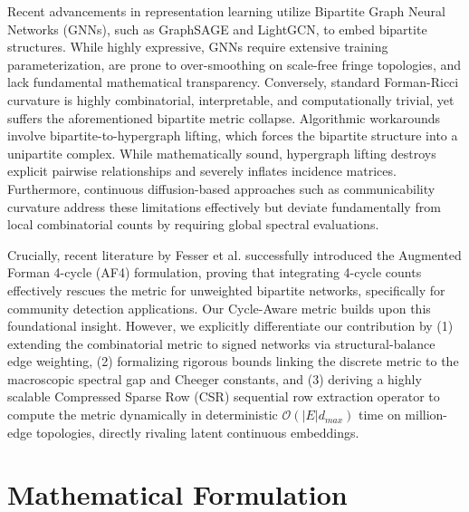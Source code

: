 \documentclass{siuro250211}
\begin{document}
Recent advancements in representation learning utilize Bipartite Graph Neural Networks (GNNs), such as GraphSAGE and LightGCN, to embed bipartite structures. While highly expressive, GNNs require extensive training parameterization, are prone to over-smoothing on scale-free fringe topologies, and lack fundamental mathematical transparency. Conversely, standard Forman-Ricci curvature is highly combinatorial, interpretable, and computationally trivial, yet suffers the aforementioned bipartite metric collapse. Algorithmic workarounds involve bipartite-to-hypergraph lifting, which forces the bipartite structure into a unipartite complex. While mathematically sound, hypergraph lifting destroys explicit pairwise relationships and severely inflates incidence matrices. Furthermore, continuous diffusion-based approaches such as communicability curvature \cite{estrada2012communicability} address these limitations effectively but deviate fundamentally from local combinatorial counts by requiring global spectral evaluations.

Crucially, recent literature by Fesser et al. \cite{fesser2024augmentations} successfully introduced the Augmented Forman 4-cycle (AF4) formulation, proving that integrating 4-cycle counts effectively rescues the metric for unweighted bipartite networks, specifically for community detection applications. Our Cycle-Aware metric builds upon this foundational insight. However, we explicitly differentiate our contribution by (1) extending the combinatorial metric to signed networks via structural-balance edge weighting, (2) formalizing rigorous bounds linking the discrete metric to the macroscopic spectral gap and Cheeger constants, and (3) deriving a highly scalable Compressed Sparse Row (CSR) sequential row extraction operator to compute the metric dynamically in deterministic $\mathcal{O}(|E|d_{max})$ time on million-edge topologies, directly rivaling latent continuous embeddings.

\section{Mathematical Formulation}
\end{document}
